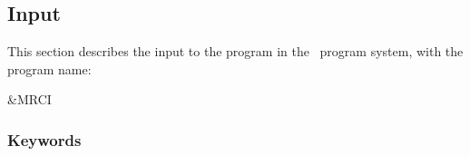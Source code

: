 
\subsection{Input}
\label{UG:sec:mrci_input}
This section describes the input to the
 program in the \molcas\ program system, with
the program name:
\begin{inputlisting}
 &MRCI
\end{inputlisting}

\subsubsection{Keywords}

